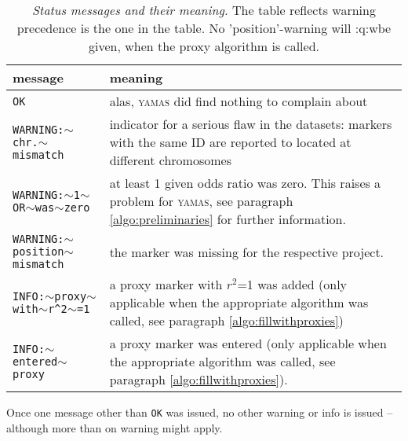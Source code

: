 \begin{table}[H]
 \caption{\emph{Status messages and their meaning.}
The table reflects warning precedence is the one in the table. No 'position'-warning will :q:wbe given, when the proxy algorithm is called.}
 \centering
\begin{tabular}{p{}p{}}
\rowcolor{light-gray}message & meaning\\\hline
\texttt{OK} & alas, \textsc{yamas} did find nothing to complain about\\
\texttt{WARNING:$\sim$chr.$\sim$mismatch} & indicator for a serious flaw in the datasets: markers with the same ID are reported to located at different chromosomes\\
\texttt{WARNING:$\sim$1$\sim$OR$\sim$was$\sim$zero} & at least 1 given odds ratio was zero. This raises a problem for \textsc{yamas}, see paragraph \ref{algo:preliminaries} for further information.\\
\texttt{WARNING:$\sim$position$\sim$mismatch} & the marker was missing for the respective project.\\
\texttt{INFO:$\sim$proxy$\sim$with$\sim$}\verb+r^2+\texttt{$\sim$=1} & a proxy marker with $r^2$=1 was added (only applicable when the appropriate algorithm was called, see paragraph \ref{algo:fillwithproxies})\\
\texttt{INFO:$\sim$entered$\sim$proxy} & a proxy marker was entered (only applicable when the appropriate algorithm was called, see paragraph \ref{algo:fillwithproxies}).
\end{tabular}
\end{table}

\alert{Once one message other than \texttt{OK} was issued, no other warning or info is issued -- although more than on warning might apply.}
